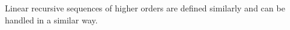 

\setcounter{section}{1}
\setcounter{subsection}{3}
\setcounter{dfn}{4}

Linear recursive sequences of higher orders are defined similarly and can be handled in a similar way.


